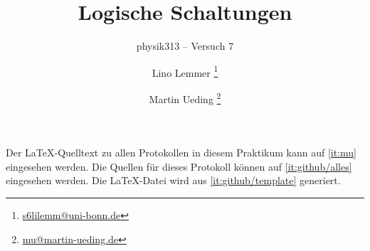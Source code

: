 


\usepackage{placeins}


\subject{Praktikumsprotokoll}
\title{Logische Schaltungen}
\subtitle{physik313 – Versuch 7}
\author{
	Lino Lemmer
    \footnote{\href{mailto:s6lilemm@uni-bonn.de}{s6lilemm@uni-bonn.de}}
	\and
	Martin Ueding
    \footnote{\href{mailto:mu@martin-ueding.de}{mu@martin-ueding.de}}
}


\newcommand\fT{f_\text{T}}
\newcommand\IB{I_\text{B}}
\newcommand\IC{I_\text{C}}
\newcommand\ID{I_\text{D}}
\newcommand\IE{I_\text{E}}
\newcommand\IS{I_\text{S}}
\newcommand\RC{R_\text{C}}
\newcommand\RD{R_\text{D}}
\newcommand\RE{R_\text{E}}
\newcommand\UBE{U_\text{BE}}
\newcommand\UB{U_\text{B}}
\newcommand\UCE{U_\text{CE}}
\newcommand\UC{U_\text{C}}
\newcommand\UD{U_\text{D}}
\newcommand\UDS{U_\text{DS}}
\newcommand\UE{U_\text{E}}
\newcommand\UGS{U_\text{GS}}
\newcommand\UG{U_\text{G}}
\newcommand\Uin{U_\text{in}}
\newcommand\Uout{U_\text{out}}

\newcommand\UEH{U_\text{E H}}
\newcommand\UEL{U_\text{E L}}
\newcommand\UH{U_\text{H}}
\newcommand\UL{U_\text{L}}
\newcommand\UQH{U_\text{Q H}}
\newcommand\UQL{U_\text{Q L}}

\newcommand\mand {\wedge}
\newcommand\mhigh{\top}
\newcommand\mlow {\bot}
\newcommand\mnand{\bar\wedge}
\newcommand\mnor {\bar\vee}
\newcommand\mnot {\neg}
\newcommand\mor  {\vee}
\newcommand\mxor {\veebar}
\newcommand\tand {\textsc{and}}
\newcommand\thigh{\textsc{high}}
\newcommand\tlow {\textsc{low}}
\newcommand\tnand{\textsc{nand}}
\newcommand\tnor {\textsc{nor}}
\newcommand\tnot {\textsc{not}}
\newcommand\tor  {\textsc{or}}
\newcommand\txor {\textsc{xor}}



\maketitle

\vfill

Der \LaTeX-Quelltext zu allen Protokollen in diesem Praktikum kann auf
\ref{it:mu} eingesehen werden. Die Quellen für dieses Protokoll können auf
\ref{it:github/alles} eingesehen werden. Die \LaTeX-Datei wird aus
\ref{it:github/template} generiert.

